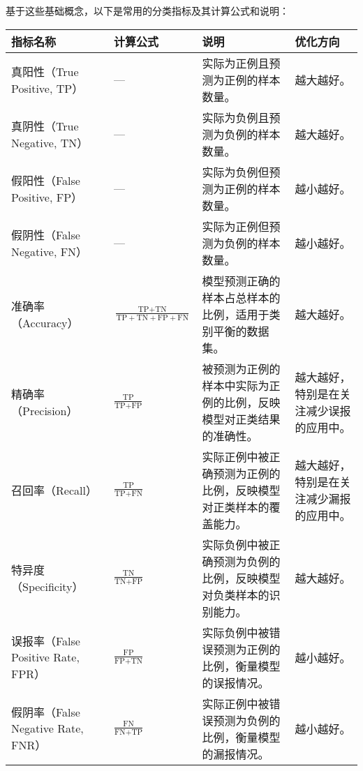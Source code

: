 \documentclass[lettersize,journal]{IEEEtran}
\begin{document}
基于这些基础概念，以下是常用的分类指标及其计算公式和说明：

\begin{table*}[h!]
\small
\centering
\begin{tabularx}{\textwidth}{|l|X|X|X|}
\hline
\textbf{指标名称} & \textbf{计算公式} & \textbf{说明} & \textbf{优化方向} \\ \hline

真阳性（True Positive, TP） & 
--- & 
实际为正例且预测为正例的样本数量。 & 越大越好。 \\ \hline

真阴性（True Negative, TN） & 
--- & 
实际为负例且预测为负例的样本数量。 & 越大越好。 \\ \hline

假阳性（False Positive, FP） & 
--- & 
实际为负例但预测为正例的样本数量。 & 越小越好。 \\ \hline

假阴性（False Negative, FN） & 
--- & 
实际为正例但预测为负例的样本数量。 & 越小越好。 \\ \hline

准确率（Accuracy） & 
$\frac{\text{TP} + \text{TN}}{\text{TP} + \text{TN} + \text{FP} + \text{FN}}$ & 
模型预测正确的样本占总样本的比例，适用于类别平衡的数据集。 & 越大越好。 \\ \hline

精确率（Precision） & 
$\frac{\text{TP}}{\text{TP} + \text{FP}}$ & 
被预测为正例的样本中实际为正例的比例，反映模型对正类结果的准确性。 & 越大越好，特别是在关注减少误报的应用中。 \\ \hline

召回率（Recall） & 
$\frac{\text{TP}}{\text{TP} + \text{FN}}$ & 
实际正例中被正确预测为正例的比例，反映模型对正类样本的覆盖能力。 & 越大越好，特别是在关注减少漏报的应用中。 \\ \hline

特异度（Specificity） & 
$\frac{\text{TN}}{\text{TN} + \text{FP}}$ & 
实际负例中被正确预测为负例的比例，反映模型对负类样本的识别能力。 & 越大越好。 \\ \hline

误报率（False Positive Rate, FPR） & 
$\frac{\text{FP}}{\text{FP} + \text{TN}}$ & 
实际负例中被错误预测为正例的比例，衡量模型的误报情况。 & 越小越好。 \\ \hline

假阴率（False Negative Rate, FNR） & 
$\frac{\text{FN}}{\text{FN} + \text{TP}}$ & 
实际正例中被错误预测为负例的比例，衡量模型的漏报情况。 & 越小越好。 \\ \hline


\end{tabularx}
\end{table*}
\end{document}

